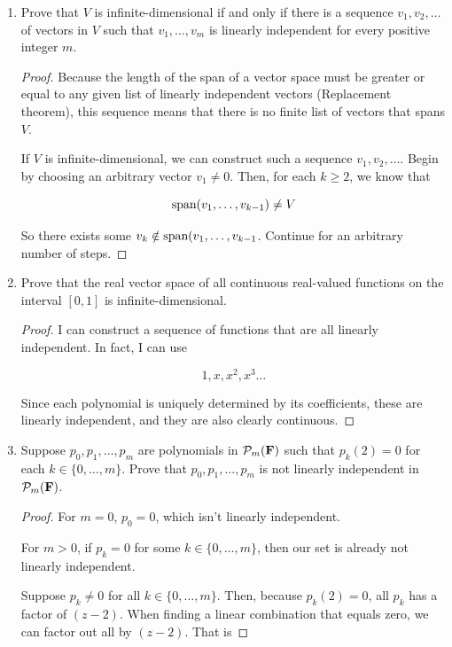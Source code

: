 \begin{enumerate}
    \item[17] Prove that $V$ is infinite-dimensional if and only if there is a sequence $v_1, v_2, \dots$ of vectors in $V$ such that $v_1, \dots, v_m$ is linearly independent for every positive integer $m$. 
    

    \begin{proof}
        Because the length of the span of a vector space must be greater or equal to any given list of linearly independent vectors (Replacement theorem), this sequence means that there is no finite list of vectors that spans $V$.

        If $V$ is infinite-dimensional, we can construct such a sequence $v_1, v_2, \dots$. Begin by choosing an arbitrary vector $v_1 \neq 0$. Then, for each $k \geq 2$, we know that 

        \[\text{span}(v_1, \dots, v_{k-1}) \neq V\]

        So there exists some $v_k \notin \text{span}(v_1, \dots, v_{k-1}$. Continue for an arbitrary number of steps.
    \end{proof}

    \item[19] Prove that the real vector space of all continuous real-valued functions on the interval $[0, 1]$ is infinite-dimensional. 
    
    \begin{proof}
        I can construct a sequence of functions that are all linearly independent. In fact, I can use 

        \[1, x, x^2, x^3 \dots\]

        Since each polynomial is uniquely determined by its coefficients, these are linearly independent, and they are also clearly continuous.
    \end{proof}

    \item[20] Suppose $p_0, p_1, \dots, p_m$ are polynomials in $\mathcal{P}_m(\bold F)$ such that $p_k(2) = 0$ for each $k \in \{0, \dots, m\}$. Prove that $p_0, p_1, \dots, p_m$ is not linearly independent in $\mathcal{P}_m(\bold F)$.
    

    \begin{proof}
        For $m = 0$, $p_0 = 0$, which isn't linearly independent.

        For $m > 0$, if $p_k = 0$ for some $k \in \{0, \dots, m\}$, then our set is already not linearly independent.

        Suppose $p_k \neq 0$ for all $k \in \{0, \dots, m\}$. Then, because $p_k(2) = 0$, all $p_k$ has a factor of $(z - 2)$. When finding a linear combination that equals zero, we can factor out all by $(z-2)$. That is 


\end{proof}
\end{enumerate}
